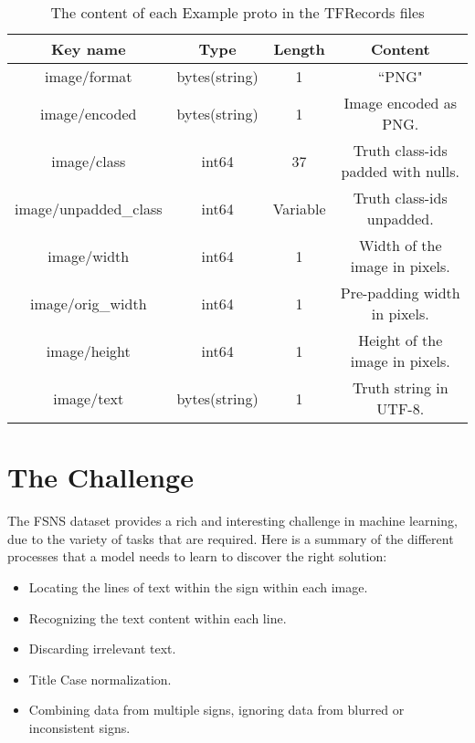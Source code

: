 \documentclass[runningheads]{llncs}
\begin{document}
\begin{table}
\begin{center}
\caption{The content of each Example proto in the TFRecords files}
\label{table:tfspec}
{\scriptsize
\begin{tabulary}{\linewidth}{| c | c | c | C |}
\hline
Key name		& Type 		& Length   & Content \\ \hline \hline
image/format  	& bytes(string) & 1 	   & ``PNG" \\ \hline 
image/encoded 	& bytes(string) & 1	   & Image encoded as PNG. \\ \hline 
image/class   	& int64		& 37	   & Truth class-ids padded with nulls. \\ \hline
image/unpadded\_class & int64		& Variable & Truth class-ids unpadded. \\ \hline
image/width		& int64		& 1	   & Width of the image in pixels. \\ \hline
image/orig\_width	& int64		& 1  	   & Pre-padding width in pixels. \\ \hline 
image/height		& int64		& 1	   & Height of the image in pixels. \\ \hline
image/text		& bytes(string)	& 1	   & Truth string in UTF-8.\\ \hline
\end{tabulary}
} 
\end{center} 
\end{table}


\section{The Challenge}\label{challenge}

The FSNS dataset provides a rich and interesting challenge in machine learning, due to the variety of
 tasks that are required. Here is a summary of the different processes that a model needs to learn to
 discover the right solution:
\begin{itemize}
\setlength\itemsep{0.5em}
\item[\labelitemii] Locating the lines of text within the sign within each image.
\item[\labelitemii] Recognizing the text content within each line.
\item[\labelitemii] Discarding irrelevant text.
\item[\labelitemii] Title Case normalization.
\item[\labelitemii] Combining data from multiple signs, ignoring data from blurred or inconsistent signs.
\end{itemize}
\end{document}
